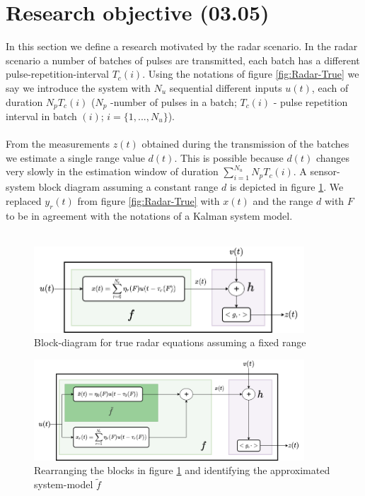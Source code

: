\documentclass[oneside,12pt]{article}
\begin{document}
\section{Research objective (03.05)}\label{sec:F_vs_S}
%
In this section we define a research motivated by the radar scenario. In the radar scenario a number of batches of pulses are transmitted, each batch has a different pulse-repetition-interval $T_c(i)$. Using the notations of figure \ref{fig:Radar-True} we say we introduce the system with $N_u$ sequential different inputs $u(t)$, each of duration $N_p T_c(i)$ ($N_p$ -number of pulses in a batch; $T_c(i)$ - pulse repetition interval in batch $(i)$; $i=\{1,...,N_u\}$).\\\\
%
From the measurements $z(t)$ obtained during the transmission of the batches we estimate a single range value $d(t)$. This is possible because $d(t)$ changes very slowly in the estimation window of duration $\sum_{i=1}^{N_u} N_p T_c(i)$. A sensor-system block diagram assuming a constant range $d$ is depicted in figure \ref{fig:Radar-fixed_range}. We replaced $y_r(t)$ from figure \ref{fig:Radar-True} with $x(t)$ and the range $d$ with $F$ to be in agreement with the notations of a Kalman system model.\\\\ 
%
\begin{figure}
    \centering
        \includegraphics[width=0.9\textwidth]{./Radar-fixed_range}
        \caption{\label{fig:Radar-fixed_range}Block-diagram for true radar equations assuming a fixed range}
\end{figure}
%
\begin{figure}
    \centering
        \includegraphics[width=0.9\textwidth]{./Radar-fixed_range_rearranged}
        \caption{\label{fig:Radar-fixed_range_rearranged}Rearranging the blocks in figure \ref{fig:Radar-fixed_range} and identifying the approximated system-model $\tilde{f}$}
\end{figure}
\end{document}

